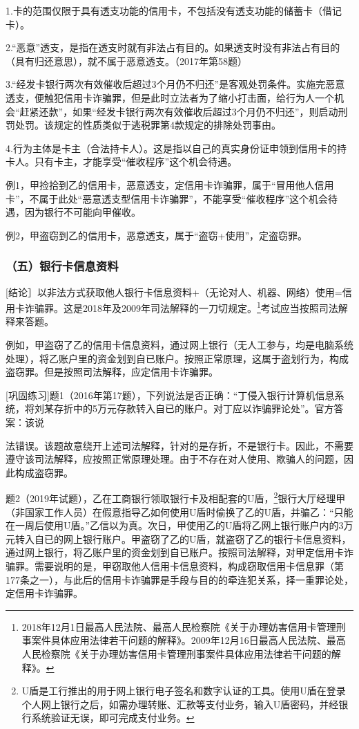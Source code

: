 1.卡的范围仅限于具有透支功能的信用卡，不包括没有透支功能的储蓄卡（借记卡）。

2.“恶意”透支，是指在透支时就有非法占有目的。如果透支时没有非法占有目的（具有归还意思），就不属于恶意透支。（2017年第58题）

3.“经发卡银行两次有效催收后超过3个月仍不归还”是客观处罚条件。实施完恶意透支，便触犯信用卡诈骗罪，但是此时立法者为了缩小打击面，给行为人一个机会“赶紧还款”，如果“经发卡银行两次有效催收后超过3个月仍不归还”，则启动刑罚处罚。该规定的性质类似于逃税罪第4款规定的排除处罚事由。

4.行为主体是卡主（合法持卡人）。这是指以自己的真实身份证申领到信用卡的持卡人。只有卡主，才能享受“催收程序”这个机会待遇。

例1，甲捡拾到乙的信用卡，恶意透支，定信用卡诈骗罪，属于“冒用他人信用卡”，不属于此处“恶意透支型信用卡诈骗罪”，不能享受“催收程序”这个机会待遇，因为银行不可能向甲催收。

例2，甲盗窃到乙的信用卡，恶意透支，属于“盗窃+使用”，定盗窃罪。

\subsubsection*{（五）银行卡信息资料}

[结论］以非法方式获取他人银行卡信息资料+（无论对人、机器、网络）使用=信用卡诈骗罪。这是2018年及2009年司法解释的一刀切规定。\footnote{2018年12月1日最高人民法院、最高人民检察院《关于办理妨害信用卡管理刑事案件具体应用法律若干问题的解释》。2009年12月16日最高人民法院、最高人民检察院《关于办理妨害信用卡管理刑事案件具体应用法律若干问题的解释》。}考试应当按照司法解释来答题。

例如，甲盗窃了乙的信用卡信息资料，通过网上银行（无人工参与，均是电脑系统处理），将乙账户里的资金划到自已账户。按照正常原理，这属于盗划行为，构成盗窃罪。但是按照司法解释，应定信用卡诈骗罪。

[巩固练习]题1（2016年第17题），下列说法是否正确：“丁侵入银行计算机信息系统，将刘某存折中的5万元存款转入自已的账户。对丁应以诈骗罪论处”。官方答案：该说

法错误。该题故意绕开上述司法解释，针对的是存折，不是银行卡。因此，不需要遵守该司法解释，应按照正常原理处理。由于不存在对人使用、欺骗人的问题，因此构成盗窃罪。

题2（2019年试题），乙在工商银行领取银行卡及相配套的U盾，\footnote{U盾是工行推出的用于网上银行电子签名和数字认证的工具。使用U盾在登录个人网上银行之后，如需办理转账、汇款等支付业务，输入U盾密码，并经银行系统验证无误，即可完成支付业务。}银行大厅经理甲（非国家工作人员）在假意指导乙如何使用U盾时偷换了乙的U盾，并骗乙：“只能在一周后使用U盾。”乙信以为真。次日，甲使用乙的U盾将乙网上银行账户内的3万元转入自已的网上银行账户。甲盗窃了乙的U盾，就盗窃了乙的银行卡信息资料，通过网上银行，将乙账户里的资金划到自已账户。按照司法解释，对甲定信用卡诈骗罪。需要说明的是，甲窃取他人信用卡信息资料，构成窃取信用卡信息罪（第177条之一），与此后的信用卡诈骗罪是手段与目的的牵连犯关系，择一重罪论处，定信用卡诈骗罪。

